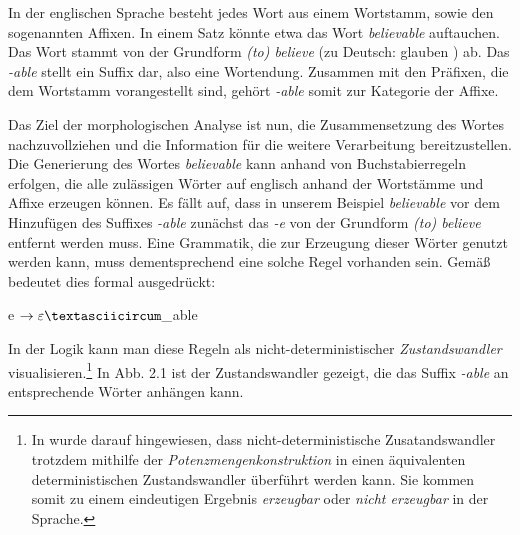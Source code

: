 \documentclass[12pt]{report}
\begin{document}
In der englischen Sprache besteht jedes Wort aus einem Wortstamm, sowie den sogenannten Affixen. In einem Satz könnte etwa das Wort \glqq \textit{believable} \grqq auftauchen. Das Wort stammt von der Grundform \glqq \textit{(to) believe} \grqq (zu Deutsch: \glqq glauben \grqq) ab. Das \textit{-able} stellt ein Suffix dar, also eine Wortendung. Zusammen mit den Präfixen, die dem Wortstamm vorangestellt sind, gehört \textit{-able} somit zur Kategorie der Affixe. 

Das Ziel der morphologischen Analyse ist nun, die Zusammensetzung des Wortes nachzuvollziehen und die Information für die weitere Verarbeitung bereitzustellen. Die Generierung des Wortes \textit{believable} kann anhand von Buchstabierregeln erfolgen, die alle zulässigen Wörter auf englisch anhand der Wortstämme und Affixe erzeugen können. Es fällt auf, dass in unserem Beispiel \textit{believable} vor dem Hinzufügen des Suffixes \textit{-able} zunächst das \textit{-e} von der Grundform \textit{(to) believe} entfernt werden muss. Eine Grammatik, die zur Erzeugung dieser Wörter genutzt werden kann, muss dementsprechend eine solche Regel vorhanden sein. Gemäß \cite{rs18} bedeutet dies formal ausgedrückt:
\tt
\begin{center}
e $\rightarrow \varepsilon \textasciicircum \_$able
\end{center}
\rm

In der Logik kann man diese Regeln als nicht-deterministischer \textit{Zustandswandler} visualisieren.\footnote{In \cite{rs18} wurde darauf hingewiesen, dass nicht-deterministische Zusatandswandler trotzdem mithilfe der \textit{Potenzmengenkonstruktion} in einen äquivalenten deterministischen Zustandswandler überführt werden kann. Sie kommen somit zu einem eindeutigen Ergebnis \textit{erzeugbar} oder \textit{nicht erzeugbar} in der Sprache.} In Abb. 2.1 ist der Zustandswandler gezeigt, die das Suffix \textit{-able} an entsprechende Wörter anhängen kann.
\\
\end{document}
